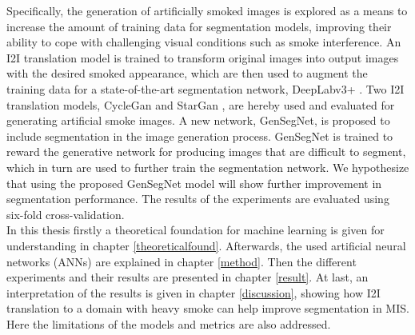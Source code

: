 Specifically, the generation of artificially smoked images is explored as a means to increase the amount of training data for segmentation models, improving their ability to cope with challenging visual conditions such as smoke interference.
An I2I translation model is trained to transform original images into output images with the desired smoked appearance, which are then used to augment the training data for a state-of-the-art segmentation network, DeepLabv3+ \cite{Chen2018a}. 
Two I2I translation models, CycleGan \cite{Zhu2017} and StarGan \cite{choi2018stargan}, are hereby used and evaluated for generating artificial smoke images. 
A new network, GenSegNet, is proposed to include segmentation in the image generation process. 
GenSegNet is trained to reward the generative network for producing images that are difficult to segment, which in turn are used to further train the segmentation network.
We hypothesize that using the proposed GenSegNet model will show further improvement in segmentation performance.
The results of the experiments are evaluated using six-fold cross-validation.\\
In this thesis firstly a theoretical foundation for machine learning is given for understanding in chapter \ref{theoreticalfound}.
Afterwards, the used artificial neural networks (ANNs) are explained in chapter \ref{method}.
Then the different experiments and their results are presented in chapter \ref{result}.
At last, an interpretation of the results is given in chapter \ref{discussion}, showing how I2I translation to a domain with heavy smoke can help improve segmentation in MIS. 
Here the limitations of the models and metrics are also addressed.

